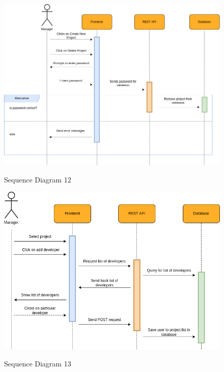 \begin{figure}[H]
    \centering
    \caption{Sequence Diagram 12}
    \includegraphics[scale=0.5]{./diagrams/sequence/seq-12.png}
    \label{fig:seq-12}
    
\end{figure}


\begin{figure}[H]
    \centering
    \caption{Sequence Diagram 13}
    \includegraphics[scale=0.5]{./diagrams/sequence/seq-13.png}
    \label{fig:seq-13}
    
\end{figure}


